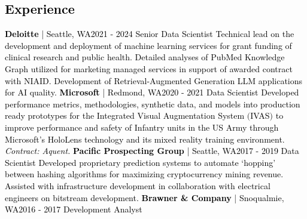 \documentclass{article}
\begin{document}
    \begin{bgbox}[
        height = \paperheight,
        width = 0.69\textwidth,
        colback = white
    ]
        \textcolor{black}{
            \section*{Experience}
                \textbf{Deloitte} | Seattle, WA\hfill{2021 - 2024}\newline
                    Senior Data Scientist\newline\newline
                Technical lead on the development and deployment of machine learning services for grant funding of clinical research and public health. Detailed analyses of PubMed Knowledge Graph utilized for marketing managed services in support of awarded contract with NIAID. Development of Retrieval-Augmented Generation LLM applications for AI quality.\newline\newline
                \textbf{Microsoft} | Redmond, WA\hfill{2020 - 2021}\newline
                    Data Scientist\newline\newline
                Developed performance metrics, methodologies, synthetic data, and models into production ready prototypes for the Integrated Visual Augmentation System $($IVAS$)$ to improve performance and safety of Infantry units in the US Army through Microsoft’s HoloLens technology and its mixed reality training environment. \textit{Contract: Aquent.}\newline\newline
                \textbf{Pacific Prospecting Group} | Seattle, WA\hfill{2017 - 2019}\newline
                    Data Scientist\newline\newline
                Developed proprietary prediction systems to automate ‘hopping’ between hashing algorithms for maximizing cryptocurrency mining revenue. Assisted with infrastructure development in collaboration with electrical engineers on bitstream development.\newline\newline
                \textbf{Brawner \& Company} | Snoqualmie, WA\hfill{2016 - 2017}\newline
                    Development Analyst\newline\newline
}
\end{bgbox}
\end{document}
